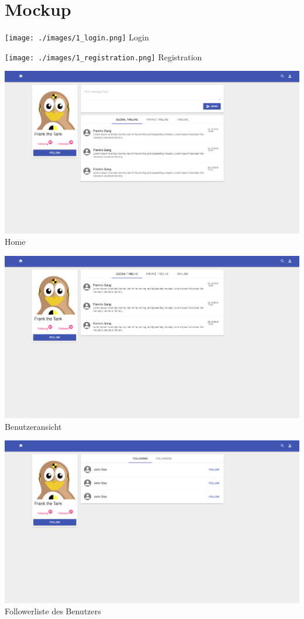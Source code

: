 \documentclass[
    a4paper
]{scrreprt}
\begin{document}
    \section{Mockup}
		\texttt{[image: ./images/1\_login.png]}
		Login\par\vspace{.6cm}
		\texttt{[image: ./images/1\_registration.png]}
		Registration\par\vspace{.6cm}
		\includegraphics[width=\textwidth]{./images/1_home.png}
		Home\par\vspace{.6cm}
		\includegraphics[width=\textwidth]{./images/1_user.png}
		Benutzeransicht\par\vspace{.6cm}
		\includegraphics[width=\textwidth]{./images/1_user_followers.png}
		Followerliste des Benutzers
    
\end{document}
